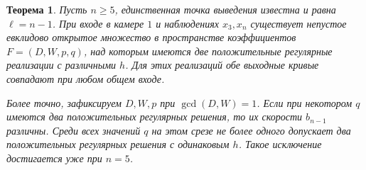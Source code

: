 \documentclass[11pt,a4paper]{article}
\newtheorem{mainthm}{Теорема}
\begin{document}
\begin{mainthm}\label{thm:preterminal}
Пусть \(n\ge5\), единственная точка выведения известна и равна \(\ell=n-1\). При входе в камере \(1\) и наблюдениях \(x_3,x_n\) существует непустое евклидово открытое множество в пространстве коэффициентов \(F=(D,W,p,q)\), над которым имеются две положительные регулярные реализации с различными \(h\). Для этих реализаций обе выходные кривые совпадают при любом общем входе.

Более точно, зафиксируем \(D,W,p\) при \(\gcd(D,W)=1\). Если при некотором \(q\) имеются два положительных регулярных решения, то их скорости \(b_{n-1}\) различны. Среди всех значений \(q\) на этом срезе не более одного допускает два положительных регулярных решения с одинаковым \(h\). Такое исключение достигается уже при \(n=5\).
\end{mainthm}
\end{document}
